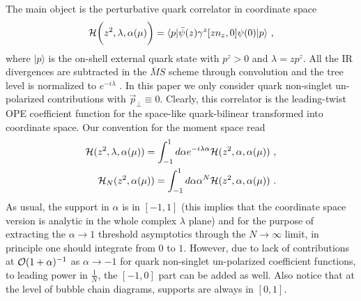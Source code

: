 \documentclass[a4paper,11pt]{article}
\begin{document}
The main object is the perturbative quark correlator in coordinate space
 \begin{align}\label{eq:deftildef}
{\cal H}\bigg(z^2,\lambda,\alpha(\mu)\bigg)=\langle p |\bar \psi(z)\gamma^z[zn_z,0]\psi(0)  | p \rangle \ ,
\end{align}
where $|p\rangle$ is the on-shell external quark state with $p^z>0$ and $\lambda=z p^z$. All the IR divergences are subtracted in the ${\overline MS}$ scheme through convolution and the tree level is normalized to $e^{-i\lambda}$ . In this paper we only consider quark non-singlet  un-polarized contributions with $\vec{p}_\perp \equiv 0$. Clearly, this correlator is the leading-twist OPE coefficient function for the space-like quark-bilinear transformed into coordinate space.  Our convention for the moment space read
\begin{align}
{\cal H}(z^2,\lambda,\alpha(\mu))=\int_{-1}^{1} d\alpha e^{-i\lambda \alpha}{\cal H}(z^2,\alpha,\alpha(\mu)) \ , \\ 
{\cal H}_N(z^2,\alpha(\mu))=\int_{-1}^1 d\alpha \alpha^N  {\cal H}(z^2,\alpha,\alpha(\mu)) \ .
\end{align}
As usual, the support in $\alpha$ is in $[-1,1]$ (this implies that the coordinate space version is analytic in the whole complex $\lambda$ plane) and for the purpose of extracting the $\alpha \rightarrow 1$ threshold asymptotics through the $N\rightarrow \infty$ limit,  in principle one should integrate from $0$ to $1$. However, due to lack of contributions at ${\cal O}(1+\alpha)^{-1}$ as $\alpha \rightarrow -1$ for quark non-singlet un-polarized coefficient functions, to leading power in $\frac{1}{N}$, the $[-1,0]$ part can be added as well. Also notice that at the level of bubble chain diagrams, supports are always in $[0,1]$. 
\end{document}
